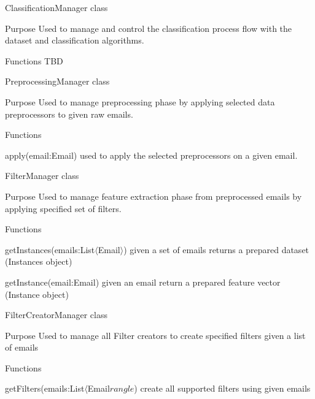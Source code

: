 \documentclass[12pt]{article}
\newenvironment{my_itemize}
{\begin{itemize}
  \setlength{\itemsep}{0cm}
  \setlength{\parskip}{0cm}}
{\end{itemize}}
\newenvironment{my_desc}
{\begin{description}
  \setlength{\itemsep}{0cm}
  \setlength{\parskip}{0cm}}
{\end{description}}
\begin{document}
\begin{my_itemize}
  \item ClassificationManager class
  \begin{my_desc}
    \item[Purpose] Used to manage and control the classification process flow
      with the dataset and classification algorithms.
    \item[Functions] TBD
  \end{my_desc}
  \item PreprocessingManager class
  \begin{my_desc}
    \item[Purpose] Used to manage preprocessing phase by applying selected data preprocessors
      to given raw emails.
    \item[Functions] \hfill
    \begin{my_itemize}
      \item apply(email:Email) used to apply the selected preprocessors on a given email.
    \end{my_itemize}
  \end{my_desc}

  \item FilterManager class
  \begin{my_desc}
    \item[Purpose] Used to manage feature extraction phase from preprocessed emails by applying
      specified set of filters.
    \item[Functions] \hfill
    \begin{my_itemize}
      \item getInstances(emails:List$\langle$Email$\rangle$) given a set of emails returns a prepared dataset (Instances object)
      \item getInstance(email:Email) given an email return a prepared feature vector (Instance object)
    \end{my_itemize}

  \end{my_desc}

  \item FilterCreatorManager class
  \begin{my_desc}
    \item[Purpose] Used to manage all Filter creators to create specified filters given a list of emails
    \item[Functions] \hfill
    \begin{my_itemize}
      \item getFilters(emails:List$\langle$Email$rangle$) create all supported filters using given emails
    \end{my_itemize}


\end{my_desc}
\end{my_itemize}
\end{document}
